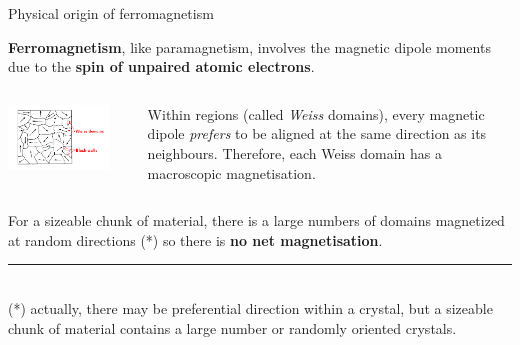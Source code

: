 \begin{frame}{Physical origin of ferromagnetism}

{\bf Ferromagnetism}, like paramagnetism, involves
 the magnetic dipole moments due to the {\bf spin of unpaired atomic electrons}.\\

\vspace{0.1cm}

\begin{columns}
  \begin{column}{0.55\textwidth}
    \begin{center}
       \includegraphics[width=0.85\textwidth]{./images/schematics/weiss_domains_01.png}\\
    \end{center}
  \end{column}
  \begin{column}{0.45\textwidth}
       Within regions (called {\em Weiss} domains),
       every magnetic dipole {\em prefers} to be aligned at the same direction as its neighbours.
       Therefore, each Weiss domain has a macroscopic magnetisation.\\
  \end{column}
\end{columns}

\vspace{0.1cm}

For a sizeable chunk of material,
there is a large numbers of domains magnetized at random directions (*)
so there is {\bf no net magnetisation}.\\

\vspace{0.1cm}

\noindent\rule{2cm}{0.4pt}\\
{\scriptsize
 (*) actually, there may be preferential direction within a crystal,
     but a sizeable chunk of material contains a large number or randomly oriented crystals.\\
}

\end{frame}


